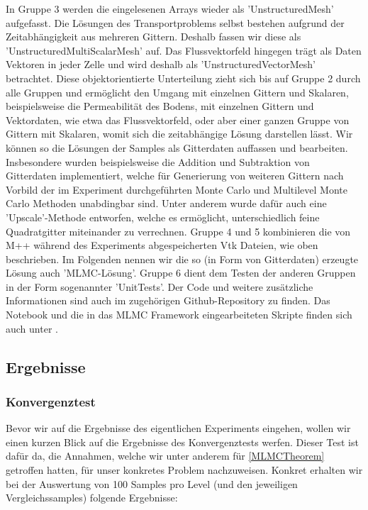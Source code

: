 In Gruppe 3 werden die eingelesenen Arrays wieder als 'UnstructuredMesh' aufgefasst. Die Lösungen des Transportproblems selbst bestehen aufgrund der Zeitabhängigkeit aus mehreren Gittern. Deshalb fassen wir diese als 'UnstructuredMultiScalarMesh' auf. Das Flussvektorfeld hingegen trägt als Daten Vektoren in jeder Zelle und wird deshalb als 'UnstructuredVectorMesh' betrachtet. Diese objektorientierte Unterteilung zieht sich bis auf Gruppe 2 durch alle Gruppen und ermöglicht den Umgang mit einzelnen Gittern und Skalaren, beispielsweise die Permeabilität des Bodens, mit einzelnen Gittern und Vektordaten, wie etwa das Flussvektorfeld, oder aber einer ganzen Gruppe von Gittern mit Skalaren, womit sich die zeitabhängige Lösung darstellen lässt. Wir können so die Lösungen der Samples als Gitterdaten auffassen und bearbeiten. Insbesondere wurden beispielsweise die Addition und Subtraktion von Gitterdaten implementiert, welche für Generierung von weiteren Gittern nach Vorbild der im Experiment durchgeführten Monte Carlo und Multilevel Monte Carlo Methoden unabdingbar sind. Unter anderem wurde dafür auch eine 'Upscale'-Methode entworfen, welche es ermöglicht, unterschiedlich feine Quadratgitter miteinander zu verrechnen.
Gruppe 4 und 5 kombinieren die von M++ während des Experiments abgespeicherten Vtk Dateien, wie oben beschrieben. Im Folgenden nennen wir die so (in Form von Gitterdaten) erzeugte Lösung auch 'MLMC-Lösung'.
Gruppe 6 dient dem Testen der anderen Gruppen in der Form sogenannter 'UnitTests'.
Der Code und weitere zusätzliche Informationen sind auch im zugehörigen Github-Repository \cite{githubvtk} zu finden. Das Notebook und die in das MLMC Framework eingearbeiteten Skripte finden sich auch unter \cite{branchMLMCTP}.

\subsection{Ergebnisse}
\subsubsection{Konvergenztest}
Bevor wir auf die Ergebnisse des eigentlichen Experiments eingehen, wollen wir einen kurzen Blick auf die Ergebnisse des Konvergenztests werfen. Dieser Test ist dafür da, die Annahmen, welche wir unter anderem für \eqref{MLMCTheorem} getroffen hatten, für unser konkretes Problem nachzuweisen.
Konkret erhalten wir bei der Auswertung von 100 Samples pro Level (und den jeweiligen Vergleichssamples) folgende Ergebnisse:

